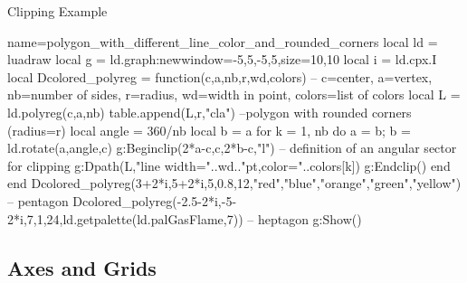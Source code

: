 \begin{demo}{Clipping Example}
\begin{luadraw}{name=polygon_with_different_line_color_and_rounded_corners}
local ld = luadraw
local g = ld.graph:new{window={-5,5,-5,5},size={10,10}}
local i = ld.cpx.I
local Dcolored_polyreg = function(c,a,nb,r,wd,colors)
-- c=center, a=vertex, nb=number of sides, r=radius, wd=width in point, colors=list of colors
    local L = ld.polyreg(c,a,nb)
    table.append(L,{r,"cla"}) --polygon with rounded corners (radius=r)
    local angle = 360/nb
    local b = a
    for k = 1, nb do
        a = b; b = ld.rotate(a,angle,c)
        g:Beginclip({2*a-c,c,2*b-c,"l"}) -- definition of an angular sector for clipping
        g:Dpath(L,"line width="..wd.."pt,color="..colors[k])
        g:Endclip()
    end
end
Dcolored_polyreg(3+2*i,5+2*i,5,0.8,12,{"red","blue","orange","green","yellow"}) -- pentagon
Dcolored_polyreg(-2.5-2*i,-5-2*i,7,1,24,ld.getpalette(ld.palGasFlame,7)) -- heptagon
g:Show()
\end{luadraw}
\end{demo}


\subsection{Axes and Grids}

